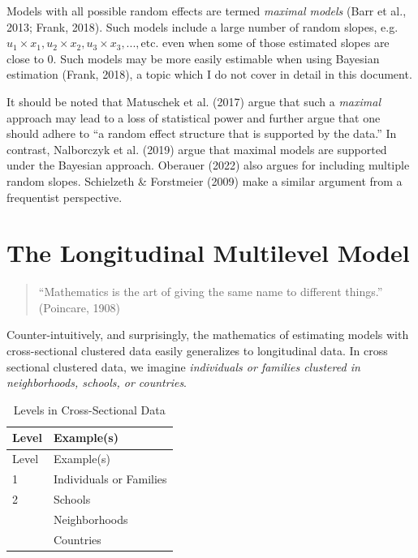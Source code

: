 \documentclass[
  letterpaper,
  DIV=11,
  numbers=noendperiod]{scrreprt}
\begin{document}
Models with all possible random effects are termed \emph{maximal models}
(Barr et al., 2013; Frank, 2018). Such models include a large number of
random slopes,
e.g.~\(u_1 \times x_1, u_2 \times x_2, u_3 \times x_3, ..., \text{etc.}\)
even when some of those estimated slopes are close to 0. Such models may
be more easily estimable when using Bayesian estimation (Frank, 2018), a
topic which I do not cover in detail in this document.

It should be noted that Matuschek et al. (2017) argue that such a
\emph{maximal} approach may lead to a loss of statistical power and
further argue that one should adhere to ``a random effect structure that
is supported by the data.'' In contrast, Nalborczyk et al. (2019) argue
that maximal models are supported under the Bayesian approach. Oberauer
(2022) also argues for including multiple random slopes. Schielzeth \&
Forstmeier (2009) make a similar argument from a frequentist
perspective.


\hypertarget{the-longitudinal-multilevel-model}{%
\chapter{The Longitudinal Multilevel
Model}\label{the-longitudinal-multilevel-model}}

\begin{quote}
``Mathematics is the art of giving the same name to different things.''
(Poincare, 1908)
\end{quote}

Counter-intuitively, and surprisingly, the mathematics of estimating
models with cross-sectional clustered data easily generalizes to
longitudinal data. In cross sectional clustered data, we imagine
\emph{individuals or families clustered in neighborhoods, schools, or
countries}.

\hypertarget{tbl-levelscrosssectional}{}
\begin{longtable}[]{@{}ll@{}}
\caption{\label{tbl-levelscrosssectional}Levels in Cross-Sectional
Data}\tabularnewline
\toprule()
Level & Example(s) \\
\midrule()
\endfirsthead
\toprule()
Level & Example(s) \\
\midrule()
\endhead
1 & Individuals or Families \\
2 & Schools \\
& Neighborhoods \\
& Countries \\
\bottomrule()
\end{longtable}
\end{document}
